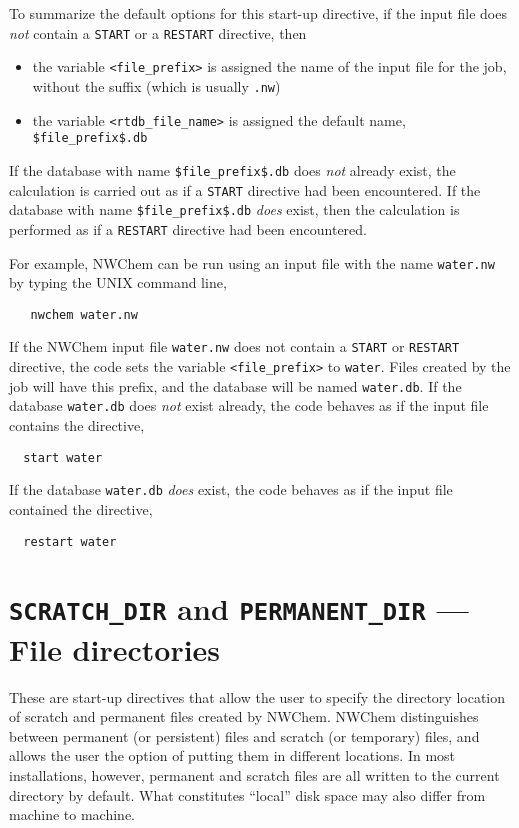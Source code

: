 To summarize the default options for this start-up directive, if the 
input file does {\em not} contain a \verb+START+ or a
\verb+RESTART+ directive, then
\begin{itemize}
  \item the variable {\tt <file\_prefix>} is assigned the name of the 
input file for the job, without the suffix (which is usually \verb+.nw+)
  \item the variable {\tt <rtdb\_file\_name>} is assigned the default name,
\verb+$file_prefix$.db+
\end{itemize}
If the database with name \verb+$file_prefix$.db+ does {\em not} 
already exist,
the calculation is carried out as if a \verb+START+ directive had
been encountered.  If the database with name \verb+$file_prefix$.db+
{\em does} exist, then the calculation is performed as if a
\verb+RESTART+ directive had been encountered.  

For example, NWChem can be run using an input file with the name 
\verb+water.nw+ 
by typing the UNIX command line,

\begin{verbatim}
   nwchem water.nw
\end{verbatim}

If the NWChem input file \verb+water.nw+ does not contain
a \verb+START+  or \verb+RESTART+ directive, the code
sets the variable {\tt <file\_prefix>} to {\tt water}.  Files created
by the job will have this prefix, and the database will be named
{\tt water.db}.  If the database \verb+water.db+ does {\em not} exist already,
the code behaves as if the input file contains the directive,

\begin{verbatim}
  start water
\end{verbatim}

If the database \verb+water.db+ {\em does} exist,
the code behaves as if the input file contained the directive,

\begin{verbatim}
  restart water
\end{verbatim}


\section{{\tt SCRATCH\_DIR} and {\tt PERMANENT\_DIR} --- File directories}
\label{sec:dirs}

These are start-up directives that allow the user to specify the
directory location of scratch and permanent files created by NWChem.
NWChem distinguishes between permanent (or persistent) files and
scratch (or temporary) files, and allows the user the option of
putting them in different locations.  In most installations, however,
permanent and scratch files are all written to the current directory
by default.  What constitutes ``local'' disk space may also differ from 
machine to machine.

